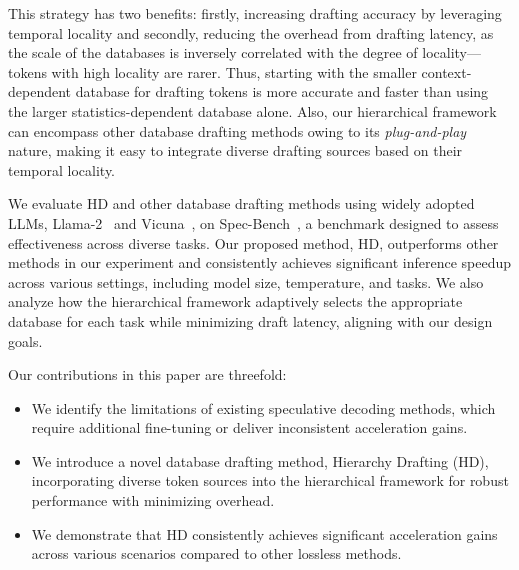 This strategy has two benefits: firstly, increasing drafting accuracy by leveraging temporal locality and
secondly, reducing the overhead from drafting latency, as the scale of the databases is inversely correlated with the degree of locality—tokens with high locality are rarer. Thus, starting with the smaller context-dependent database for drafting tokens is more accurate and faster than using the larger statistics-dependent database alone.
Also, our hierarchical framework can encompass other database drafting methods owing to its \textit{plug-and-play} nature, making it easy to integrate diverse drafting sources based on their temporal locality.

We evaluate HD and other database drafting methods using widely adopted LLMs, Llama-2~\cite{Llama2} and Vicuna~\cite{vicuna}, on Spec-Bench~\cite{Spec_Survey}, a benchmark designed to assess effectiveness across diverse tasks.
Our proposed method, HD, outperforms other methods in our experiment and consistently achieves significant inference speedup across various settings, including model size, temperature, and tasks.
We also analyze how the hierarchical framework adaptively selects the appropriate database for each task while minimizing draft latency, aligning with our design goals.


Our contributions in this paper are threefold:
\vspace{-0.1in}
\begin{itemize}[itemsep=0.3mm, parsep=1pt, leftmargin=*]
    \item We identify the limitations of existing speculative decoding methods, which require additional fine-tuning or deliver inconsistent acceleration gains.
    \item We introduce a novel database drafting method, Hierarchy Drafting (HD), incorporating diverse token sources into the hierarchical framework for robust performance with minimizing overhead.
    \item We demonstrate that HD consistently achieves significant acceleration gains across various scenarios compared to other lossless methods.
\end{itemize}

